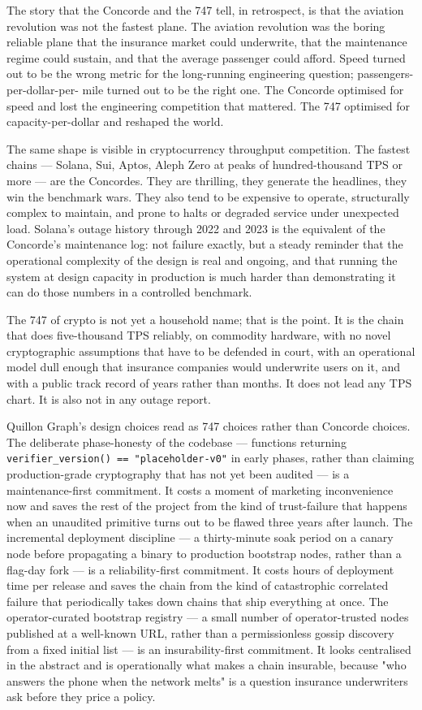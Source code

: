 \documentclass[11pt,a4paper]{article}
\begin{document}
The story that the Concorde and the 747 tell, in retrospect, is that the
aviation revolution was not the fastest plane. The aviation revolution
was the boring reliable plane that the insurance market could
underwrite, that the maintenance regime could sustain, and that the
average passenger could afford. Speed turned out to be the wrong metric
for the long-running engineering question; passengers-per-dollar-per-
mile turned out to be the right one. The Concorde optimised for speed
and lost the engineering competition that mattered. The 747 optimised
for capacity-per-dollar and reshaped the world.

The same shape is visible in cryptocurrency throughput competition. The
fastest chains --- Solana, Sui, Aptos, Aleph Zero at peaks of
hundred-thousand TPS or more --- are the Concordes. They are thrilling,
they generate the headlines, they win the benchmark wars. They also tend
to be expensive to operate, structurally complex to maintain, and prone
to halts or degraded service under unexpected load. Solana's outage
history through 2022 and 2023 is the equivalent of the Concorde's
maintenance log: not failure exactly, but a steady reminder that the
operational complexity of the design is real and ongoing, and that
running the system at design capacity in production is much harder than
demonstrating it can do those numbers in a controlled benchmark.

The 747 of crypto is not yet a household name; that is the point. It is
the chain that does five-thousand TPS reliably, on commodity hardware,
with no novel cryptographic assumptions that have to be defended in
court, with an operational model dull enough that insurance companies
would underwrite users on it, and with a public track record of years
rather than months. It does not lead any TPS chart. It is also not in
any outage report.

Quillon Graph's design choices read as 747 choices rather than Concorde
choices. The deliberate phase-honesty of the codebase --- functions
returning \texttt{verifier\_version() == "placeholder-v0"} in early
phases, rather than claiming production-grade cryptography that has not
yet been audited --- is a maintenance-first commitment. It costs a
moment of marketing inconvenience now and saves the rest of the project
from the kind of trust-failure that happens when an unaudited primitive
turns out to be flawed three years after launch. The incremental
deployment discipline --- a thirty-minute soak period on a canary node
before propagating a binary to production bootstrap nodes, rather than
a flag-day fork --- is a reliability-first commitment. It costs hours of
deployment time per release and saves the chain from the kind of
catastrophic correlated failure that periodically takes down chains
that ship everything at once. The operator-curated bootstrap registry
--- a small number of operator-trusted nodes published at a well-known
URL, rather than a permissionless gossip discovery from a fixed initial
list --- is an insurability-first commitment. It looks centralised in
the abstract and is operationally what makes a chain insurable, because
"who answers the phone when the network melts" is a question insurance
underwriters ask before they price a policy.
\end{document}
